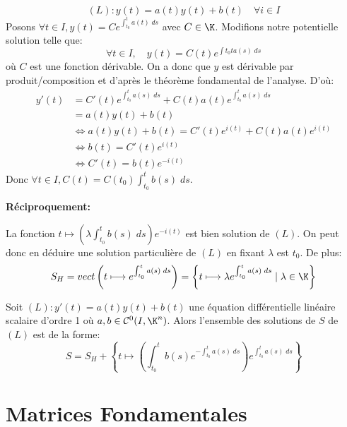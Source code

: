 \begin{remark}
		\[ (L) : y(t) = a(t) y(t) + b(t) \quad \forall i \in I \] 
	Posons $ \forall t \in I, y(t) = C e^{\int_{t_0}^{t} a(t) \; ds}$ avec $C \in \K$. 
	Modifions notre potentielle solution telle que: 
		\[ \forall t \in I, \quad y(t) = C(t) e^{\int{t_0}{t} a(s) \; ds} \]
	où $C$ est une fonction dérivable. On a donc que $y$ est dérivable par produit/composition
	et d'après le théorème fondamental de l'analyse. D'où: 
		\begin{align*}
			y'(t) &= C'(t) e^{\int_{t_0}^{t} a(s) \; ds} + C(t) a(t) e^{\int_{t_0}^{t} a(s) \; ds} \\
				  &= a(t)y(t) + b(t) \\
				  & \iff a(t) y(t) + b(t) = C'(t) e^{i(t)} + C(t) a(t) e^{i(t)} \\ 
				  & \iff b(t) = C'(t) e^{i(t)} \\ 
				  & \iff C'(t) = b(t) e^{-i(t)} 
		\end{align*}
	Donc $ \forall t \in I, C(t) = C(t_0) \int_{t_0}^{t} b(s) \; ds $. 
	
	\textbf{Réciproquement:}

	La fonction $ t \longmapsto \left( \lambda \int_{t_0}^{t} b(s) \; ds \right) e^{-i(t)} $ 
	est bien solution de $(L)$. On peut donc en déduire une solution particulière de $(L)$
	en fixant $\lambda$ est $t_0$. De plus: 
		\[ S_H = vect \left( t \longmapsto e^{ \int_{t_0}^{t} a(s) \; ds } \right) 
		= \left\{ t \longmapsto \lambda e^{ \int_{t_0}^{t} a(s) \; ds} \; | \; \lambda \in \K  \right\} \] 
\end{remark}

\begin{theorem}
	Soit $(L) : y'(t) = a(t)y(t) + b(t) $ une équation différentielle linéaire scalaire  d'ordre 1 où 
	$a,b \in \mathcal{C}^0(I, \K^n)$. Alors l'ensemble des solutions de $S$ de $(L)$ est de la forme: 
		\[ S = S_H + \left\{ t \longmapsto \left( \int_{t_0}^{t} b(s) e^{- \int_{t_0}^{t} a(s) \; ds} \right) e^{\int_{t_0}^{t} a(s) \; ds} \right\} \] 
\end{theorem}


\section{Matrices Fondamentales}


